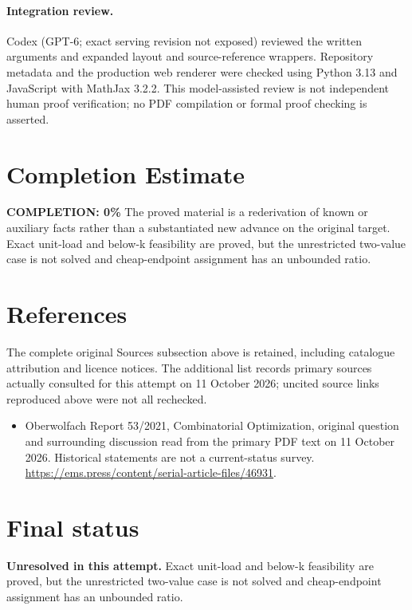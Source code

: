 \documentclass[11pt]{article}
\begin{document}
\paragraph{Integration review.} Codex (GPT-6; exact serving revision not exposed) reviewed the written arguments and expanded layout and source-reference wrappers. Repository metadata and the production web renderer were checked using Python 3.13 and JavaScript with MathJax 3.2.2. This model-assisted review is not independent human proof verification; no PDF compilation or formal proof checking is asserted.

\section{Completion Estimate}
\noindent\textbf{COMPLETION: 0\%}
The proved material is a rederivation of known or auxiliary facts rather than a substantiated new advance on the original target. Exact unit-load and below-k feasibility are proved, but the unrestricted two-value case is not solved and cheap-endpoint assignment has an unbounded ratio.
\section{References}
The complete original Sources subsection above is retained, including catalogue attribution and licence notices. The additional list records primary sources actually consulted for this attempt on 11 October 2026; uncited source links reproduced above were not all rechecked.
\begin{itemize}
\item Oberwolfach Report 53/2021, Combinatorial Optimization, original question and surrounding discussion read from the primary PDF text on 11 October 2026. Historical statements are not a current-status survey. \url{https://ems.press/content/serial-article-files/46931}.
\end{itemize}
\section{Final status}
\textbf{Unresolved in this attempt.} Exact unit-load and below-k feasibility are proved, but the unrestricted two-value case is not solved and cheap-endpoint assignment has an unbounded ratio.
\end{document}
